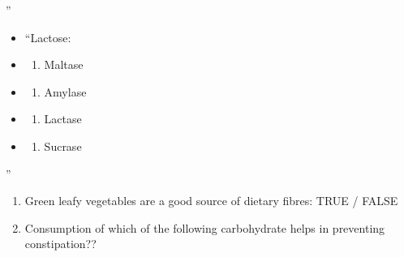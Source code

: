 \documentclass[
]{book}
\providecommand{\tightlist}{%
  \setlength{\itemsep}{0pt}\setlength{\parskip}{0pt}}
\begin{document}
''

\begin{itemize}
\item
  ``Lactose:
\item
  \begin{enumerate}
  \def\labelenumi{(\Alph{enumi})}
  \tightlist
  \item
    Maltase\\
  \end{enumerate}
\item
  \begin{enumerate}
  \def\labelenumi{(\Alph{enumi})}
  \setcounter{enumi}{1}
  \tightlist
  \item
    Amylase\\
  \end{enumerate}
\item
  \begin{enumerate}
  \def\labelenumi{(\Alph{enumi})}
  \setcounter{enumi}{2}
  \tightlist
  \item
    Lactase\\
  \end{enumerate}
\item
  \begin{enumerate}
  \def\labelenumi{(\Alph{enumi})}
  \setcounter{enumi}{3}
  \tightlist
  \item
    Sucrase
  \end{enumerate}
\end{itemize}

''

\begin{enumerate}
\def\labelenumi{\arabic{enumi}.}
\setcounter{enumi}{1}
\item
  Green leafy vegetables are a good source of dietary fibres: TRUE / FALSE
\item
  Consumption of which of the following carbohydrate helps in preventing constipation??
\end{enumerate}
\end{document}
